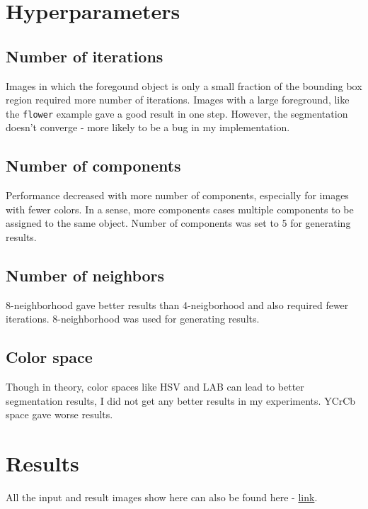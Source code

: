 \documentclass[a4paper,11]{article}
\begin{document}
     
\section{Hyperparameters}
\subsection{Number of iterations}
Images in which the foregound object is only a small fraction of the bounding box region required more number of iterations. Images with a large foreground, like the \texttt{flower} example gave a good result in one step. However, the segmentation doesn't converge - more likely to be a bug in my implementation.

\subsection{Number of components}
Performance decreased with more number of components, especially for images with fewer colors. In a sense, more components cases multiple components to be assigned to the same object. Number of components was set to 5 for generating results.

\subsection{Number of neighbors}
8-neighborhood gave better results than 4-neigborhood and also required fewer iterations. 8-neighborhood was used for generating results.

\subsection{Color space}
Though in theory, color spaces like HSV and LAB can lead to better segmentation results, I did not get any better results in my experiments. YCrCb space gave worse results.
  
\section{Results}
All the input and result images show here can also be found here - \href{https://drive.google.com/drive/folders/1ctn--zOvO0Ccc5qZbPCyCRNH6bSbNcWa?usp=sharing}{link}.
  
\end{document}
